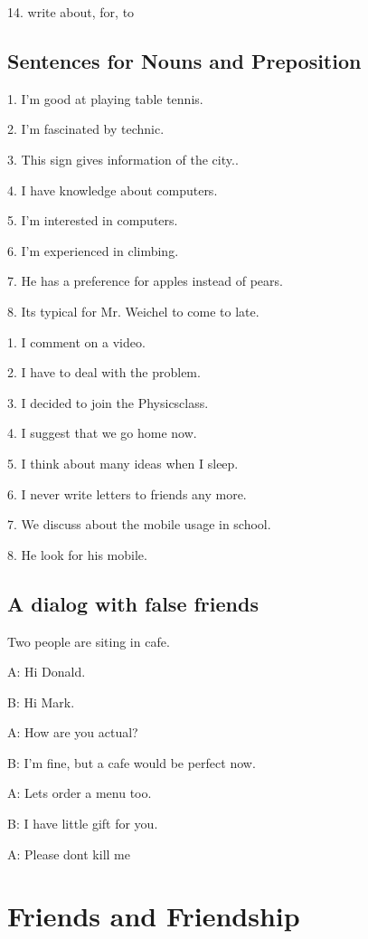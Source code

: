 \documentclass[11pt, oneside]{article}
\begin{document}
14. write about, for, to
\pagebreak

\subsection{Sentences for Nouns and Preposition}

1. I'm good at playing table tennis.

2. I'm fascinated by technic.

3. This sign gives information of the city..

4. I have knowledge about computers.

5. I'm interested in computers.

6. I'm experienced in climbing.

7. He has a preference for apples instead of pears.

8. Its typical for Mr. Weichel to come to late.



1. I comment on a video.

2. I have to deal with the problem.

3. I decided  to join the Physicsclass.

4. I suggest that we go home now.	

5. I think about many ideas when I sleep.

6. I never write letters to friends any more.

7. We discuss about the mobile usage in school.

8. He look for his mobile.

\pagebreak

\subsection{A dialog with false friends}

Two people are siting in cafe.

A: Hi Donald.

B: Hi Mark. 

A: How are you actual?

B: I'm fine, but a cafe would be perfect now.

A: Lets order a menu too.

B: I have little gift for you.

A: Please dont kill me

\pagebreak

\section{Friends and Friendship}
\end{document}
